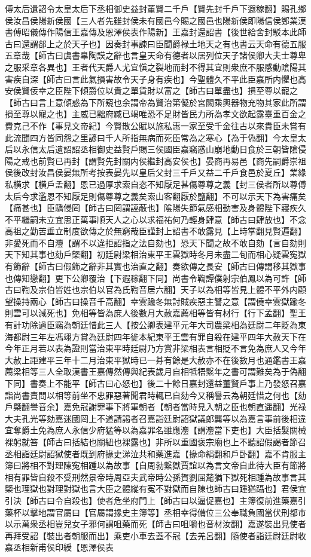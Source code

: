 傅太后遺詔令太皇太后下丞相御史益封董賢二千戶【賢先封千戶下遐稼翻】賜孔鄉侯汝昌侯陽新侯國【三人者先雖封侯未有國邑今賜之國邑也陽新侯即陽信侯鄭業漢書傅昭儀傳作陽信王嘉傳及恩澤侯表作陽新】王嘉封還詔書【後世給舍封駁本此師古曰還謂郤上之於天子也】因奏封事諫曰臣聞爵禄土地天之有也書云天命有德五服五章哉【師古曰虞書辠陶謨之辭也言皇天命有德者以居列位天子諸侯卿大夫士尊卑之服采章各異也】王者代天爵人尤宜愼之裂地而封不得其宜則衆庶不服感動隂陽其害疾自深【師古曰言此氣損害故令天子身有疾也】今聖體久不平此臣嘉所内懼也高安侯賢佞幸之臣陛下傾爵位以貴之單貨財以富之【師古曰單盡也】損至尊以寵之【師古曰言上意傾惑為下所窺也余謂帝為賢治第儗於宮闕乘輿器物充物其家此所謂損至尊以寵之也】主威已黜府臧已竭唯恐不足財皆民力所為孝文欲起露臺重百金之費克己不作【事見文帝紀】今賢散公賦以施私惠一家至受千金往古以來貴臣未嘗有此流聞四方皆同怨之里諺曰千人所指無病而死臣常為之寒心【為于偽翻】今太皇太后以永信太后遺詔詔丞相御史益賢戶賜三侯國臣嘉竊惑山崩地動日食於三朝皆隂侵陽之戒也前賢已再封【謂賢先封關内侯繼封高安侯也】晏商再易邑【商先嗣爵崇祖侯後改封汝昌侯晏無所考按表晏先以皇后父封三千戶又益二千戶食邑於夏丘】業緣私横求【横戶孟翻】恩已過厚求索自恣不知厭足甚傷尊尊之義【封三侯者所以尊傅太后今求濫恩不知厭足則傷尊尊之義矣索山客翻厭於鹽翻】不可以示天下為害痛矣【痛甚也】臣驕侵罔【師古曰罔謂誣蔽也】隂陽失節氣感相動害及身體陛下寢疾久不平繼嗣未立宜思正萬事順天人之心以求福祐何乃輕身肆意【師古曰肆放也】不念高祖之勤苦垂立制度欲傳之於無窮哉臣謹封上詔書不敢露見【上時掌翻見賢遍翻】非愛死而不自灋【謂不以違拒詔指之法自劾也】恐天下聞之故不敢自劾【言自劾則天下知其事也劾戶槩翻】初廷尉梁相治東平王雲獄時冬月未盡二旬而相心疑雲寃獄有飾辭【師古曰假飾之辭非其實也治直之翻】奏欲傳之長安【師古曰傳謂移其獄事也傳知戀翻】更下公卿覆治【下遐稼翻下同】尚書令鞫譚僕射宗伯鳳以為可許【師古曰鞫及宗伯皆姓也宗伯以官為氏鞫音居六翻】天子以為相等皆見上體不平外内顧望操持兩心【師古曰操音千高翻】幸雲踰冬無討賊疾惡主讐之意【謂僥幸雲獄踰冬則雲可以減死也】免相等皆為庶人後數月大赦嘉薦相等皆有材行【行下孟翻】聖王有計功除過臣竊為朝廷惜此三人【按公卿表建平元年大司農梁相為廷尉二年貶為東海都尉三年左馮翊方賞為廷尉四年徙本紀東平王雲有罪自殺在建平四年大赦天下在今年正月若以表為證則當治東平時廷尉乃方賞非梁相表言相貶不言免為庶人又今年大赦上距建平三年十二月治東平獄時已一朞有餘是大赦亦不在後數月也通鑑書王嘉薦梁相等三人全取漢書王嘉傳然傳與紀表歲月自相牴牾繫年之書可謂難矣為于偽翻下同】書奏上不能平【師古曰心怒也】後二十餘日嘉封還益董賢戶事上乃發怒召嘉詣尚書責問以相等前坐不忠罪惡著聞君時輒已自劾今又稱譽云為朝廷惜之何也【劾戶槩翻譽音余】嘉免冠謝罪事下將軍朝者【朝者當時見入朝之臣也朝直遥翻】光禄大夫孔光等劾嘉迷國罔上不道請謁者召嘉詣廷尉詔獄議郎龔等以為嘉言事前後相違宜奪爵土免為庶人永信少府猛等以為嘉罪名雖應灋【謂灋當下吏也】大臣括髮關械裸躬就笞【師古曰括結也關紐也裸露也】非所以重國褒宗廟也上不聽詔假謁者節召丞相詣廷尉詔獄使者既到府掾史涕泣共和藥進嘉【掾命絹翻和戶卧翻】嘉不肯服主簿曰將相不對理陳寃相踵以為故事【自周勃繋獄賈誼以為言文帝自此待大臣有節將相有罪皆自殺不受刑然景帝時周亞夫武帝時公孫賀劉屈氂猶下獄死相踵為故事言其槩也理獄也對理對獄也言大臣之體縱有寃不對獄而自陳也師古曰踵猶躡也】君侯宜引決【師古曰令自殺也】使者危坐府門上【師古曰以逼促嘉也】主簿復前進藥嘉引藥杯以擊地謂官屬曰【官屬謂掾史主簿等】丞相幸得備位三公奉職負國當伏刑都市以示萬衆丞相豈兒女子邪何謂咀藥而死【師古曰咀嚼也音材汝翻】嘉遂裝出見使者再拜受詔【裝出者朝服而出】乘吏小車去蓋不冠【去羌呂翻】隨使者詣廷尉廷尉收嘉丞相新甫侯印綬【恩澤侯表
